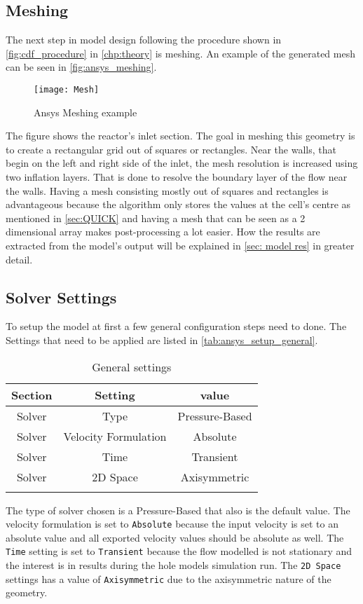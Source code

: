 \documentclass[../thesis.tex]{subfiles}
\begin{document}
\subsection{Meshing}
The next step in model design following the procedure shown in \autoref{fig:cdf_procedure} in \autoref{chp:theory} is meshing. An example of the generated mesh can be seen in \autoref{fig:ansys_meshing}.
\begin{figure}[htb]
	\centering
	\texttt{[image: Mesh]}
	\caption{Ansys Meshing example}
	\label{fig:ansys_meshing}
\end{figure}
The figure shows the reactor's inlet section. The goal in meshing this geometry is to create a rectangular grid out of squares or rectangles. Near the walls, that begin on the left and right side of the inlet, the mesh resolution is increased using two inflation layers. That is done to resolve the boundary layer of the flow near the walls. Having a mesh consisting mostly out of squares and rectangles is advantageous because the algorithm only stores the values at the cell's centre as mentioned in \autoref{sec:QUICK} and having a mesh that can be seen as a 2 dimensional array makes post-processing a lot easier. How the results are extracted from the model's output will be explained in \autoref{sec: model res} in greater detail.

\subsection{Solver Settings}
\label{sec: setup}

To setup the model at first a few general configuration steps need to done. The Settings that need to be applied are listed in \autoref{tab:ansys_setup_general}.

\begin{table} [htb]
	\centering
	\caption{General settings}
	\begin{tabular}{ ccc }
		\hline
		Section & Setting & value \\
		\hline
		Solver & Type & Pressure-Based \\
		Solver & Velocity Formulation & Absolute  \\
		Solver & Time &  Transient  \\
		Solver & 2D Space & Axisymmetric \\
		\hline
		\label{tab:ansys_setup_general}
	\end{tabular}
\end{table}
The type of solver chosen is a Pressure-Based that also is the default value. The velocity formulation is set to \texttt{Absolute} because the input velocity is set to an absolute value and all exported velocity values should be absolute as well. The \texttt{Time} setting is set to \texttt{Transient} because the flow modelled is not stationary and the interest is in results during the hole models simulation run. The \texttt{2D Space} settings has a value of \texttt{Axisymmetric} due to the axisymmetric nature of the geometry. 
\end{document}
